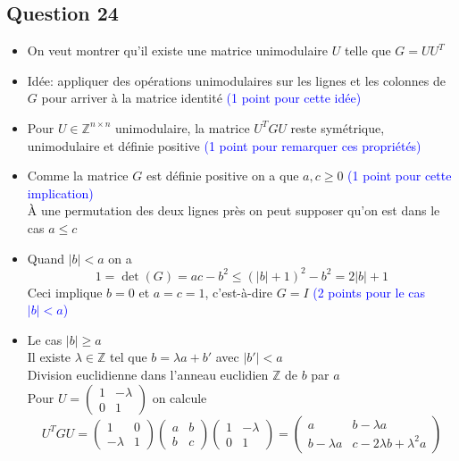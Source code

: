 \documentclass[11pt, a4paper, oneside]{article}
\newcommand{\indice}[1]{{\scriptsize \color{RubineRed} {#1}}}
\begin{document}
\subsection*{Question 24}
\begin{itemize}
\item On veut montrer qu'il existe une matrice unimodulaire $U$ telle que $G = UU^T$
\item Idée: appliquer des opérations unimodulaires sur les lignes et les colonnes de $G$ pour arriver à la matrice identité \textcolor{blue}{(1 point pour cette idée)}
\item Pour $U \in \mathbb{Z}^{n \times n}$ unimodulaire, la matrice $U^TGU$ reste symétrique, unimodulaire et définie positive \textcolor{blue}{(1 point pour remarquer ces propriétés)}
\item Comme la matrice $G$ est définie positive on a que $a,c \geq 0$ \textcolor{blue}{(1 point pour cette implication)} \\
\indice{À une permutation des deux lignes près on peut supposer qu'on est dans le cas $a \leq c$}
\item Quand $|b|<a$ on a $$1=\det(G)=ac-b^2\leq(|b|+1)^2-b^2=2|b|+1$$ Ceci implique $b=0$ et $a=c=1$, c'est-à-dire $G=I$ \textcolor{blue}{(2 points pour le cas $|b|<a$)}
\item Le cas $|b|\geq a$ \\
Il existe $\lambda \in \mathbb{Z}$ tel que $b=\lambda a + b'$ avec $|b'|<a$ \\
\indice{Division euclidienne dans l'anneau euclidien $\mathbb{Z}$ de $b$ par $a$} \\
Pour $U = \begin{pmatrix} 1 & -\lambda \\ 0 & 1 \end{pmatrix}$ on calcule 
$$U^TGU = \begin{pmatrix} 1 & 0 \\ -\lambda & 1 \end{pmatrix} \begin{pmatrix} a & b \\ b & c\end{pmatrix} \begin{pmatrix} 1 & -\lambda \\ 0 & 1 \end{pmatrix} = \begin{pmatrix} a & b-\lambda a \\ b-\lambda a & c-2\lambda b + \lambda^2a \end{pmatrix}$$

\end{itemize}
\end{document}
